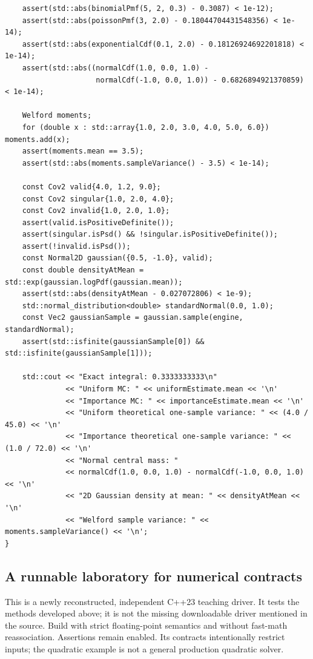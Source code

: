 \begin{verbatim}
    assert(std::abs(binomialPmf(5, 2, 0.3) - 0.3087) < 1e-12);
    assert(std::abs(poissonPmf(3, 2.0) - 0.18044704431548356) < 1e-14);
    assert(std::abs(exponentialCdf(0.1, 2.0) - 0.18126924692201818) < 1e-14);
    assert(std::abs((normalCdf(1.0, 0.0, 1.0) -
                     normalCdf(-1.0, 0.0, 1.0)) - 0.6826894921370859) < 1e-14);

    Welford moments;
    for (double x : std::array{1.0, 2.0, 3.0, 4.0, 5.0, 6.0}) moments.add(x);
    assert(moments.mean == 3.5);
    assert(std::abs(moments.sampleVariance() - 3.5) < 1e-14);

    const Cov2 valid{4.0, 1.2, 9.0};
    const Cov2 singular{1.0, 2.0, 4.0};
    const Cov2 invalid{1.0, 2.0, 1.0};
    assert(valid.isPositiveDefinite());
    assert(singular.isPsd() && !singular.isPositiveDefinite());
    assert(!invalid.isPsd());
    const Normal2D gaussian({0.5, -1.0}, valid);
    const double densityAtMean = std::exp(gaussian.logPdf(gaussian.mean));
    assert(std::abs(densityAtMean - 0.027072806) < 1e-9);
    std::normal_distribution<double> standardNormal(0.0, 1.0);
    const Vec2 gaussianSample = gaussian.sample(engine, standardNormal);
    assert(std::isfinite(gaussianSample[0]) && std::isfinite(gaussianSample[1]));

    std::cout << "Exact integral: 0.3333333333\n"
              << "Uniform MC: " << uniformEstimate.mean << '\n'
              << "Importance MC: " << importanceEstimate.mean << '\n'
              << "Uniform theoretical one-sample variance: " << (4.0 / 45.0) << '\n'
              << "Importance theoretical one-sample variance: " << (1.0 / 72.0) << '\n'
              << "Normal central mass: "
              << normalCdf(1.0, 0.0, 1.0) - normalCdf(-1.0, 0.0, 1.0) << '\n'
              << "2D Gaussian density at mean: " << densityAtMean << '\n'
              << "Welford sample variance: " << moments.sampleVariance() << '\n';
}
\end{verbatim}

\subsection{A runnable laboratory for numerical contracts}\label{a-runnable-laboratory-for-numerical-contracts}

This is a newly reconstructed, independent C++23 teaching driver. It tests the methods developed above; it is not the missing downloadable driver mentioned in the source. Build with strict floating-point semantics and without fast-math reassociation. Assertions remain enabled. Its contracts intentionally restrict inputs; the quadratic example is not a general production quadratic solver.

